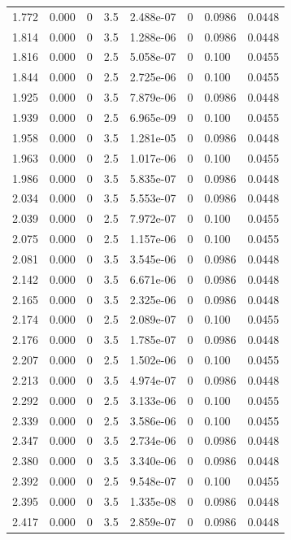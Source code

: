 \documentclass[preview]{standalone}
\begin{document}
{{{\begin{tabular}{L{1.2cm}C{1.2cm} C{0.3cm}C{0.5cm} C{1.4cm}C{1.4cm} C{1.4cm}C{1.4cm}}
  1.772  &  0.000  & 0     & 3.5 &  2.488e-07  & 0  & 0.0986 &  0.0448   \\ 
  1.814  &  0.000  & 0     & 3.5 &  1.288e-06  & 0  & 0.0986 &  0.0448   \\ 
  1.816  &  0.000  & 0     & 2.5 &  5.058e-07  & 0  & 0.100 &  0.0455   \\ 
  1.844  &  0.000  & 0     & 2.5 &  2.725e-06  & 0  & 0.100 &  0.0455   \\ 
  1.925  &  0.000  & 0     & 3.5 &  7.879e-06  & 0  & 0.0986 &  0.0448   \\ 
  1.939  &  0.000  & 0     & 2.5 &  6.965e-09  & 0  & 0.100 &  0.0455   \\ 
  1.958  &  0.000  & 0     & 3.5 &  1.281e-05  & 0  & 0.0986 &  0.0448   \\ 
  1.963  &  0.000  & 0     & 2.5 &  1.017e-06  & 0  & 0.100 &  0.0455   \\ 
  1.986  &  0.000  & 0     & 3.5 &  5.835e-07  & 0  & 0.0986 &  0.0448   \\ 
  2.034  &  0.000  & 0     & 3.5 &  5.553e-07  & 0  & 0.0986 &  0.0448   \\ 
  2.039  &  0.000  & 0     & 2.5 &  7.972e-07  & 0  & 0.100 &  0.0455   \\ 
  2.075  &  0.000  & 0     & 2.5 &  1.157e-06  & 0  & 0.100 &  0.0455   \\ 
  2.081  &  0.000  & 0     & 3.5 &  3.545e-06  & 0  & 0.0986 &  0.0448   \\ 
  2.142  &  0.000  & 0     & 3.5 &  6.671e-06  & 0  & 0.0986 &  0.0448   \\ 
  2.165  &  0.000  & 0     & 3.5 &  2.325e-06  & 0  & 0.0986 &  0.0448   \\ 
  2.174  &  0.000  & 0     & 2.5 &  2.089e-07  & 0  & 0.100 &  0.0455   \\ 
  2.176  &  0.000  & 0     & 3.5 &  1.785e-07  & 0  & 0.0986 &  0.0448   \\ 
  2.207  &  0.000  & 0     & 2.5 &  1.502e-06  & 0  & 0.100 &  0.0455   \\ 
  2.213  &  0.000  & 0     & 3.5 &  4.974e-07  & 0  & 0.0986 &  0.0448   \\ 
  2.292  &  0.000  & 0     & 2.5 &  3.133e-06  & 0  & 0.100 &  0.0455   \\ 
  2.339  &  0.000  & 0     & 2.5 &  3.586e-06  & 0  & 0.100 &  0.0455   \\ 
  2.347  &  0.000  & 0     & 3.5 &  2.734e-06  & 0  & 0.0986 &  0.0448   \\ 
  2.380  &  0.000  & 0     & 3.5 &  3.340e-06  & 0  & 0.0986 &  0.0448   \\ 
  2.392  &  0.000  & 0     & 2.5 &  9.548e-07  & 0  & 0.100 &  0.0455   \\ 
  2.395  &  0.000  & 0     & 3.5 &  1.335e-08  & 0  & 0.0986 &  0.0448   \\ 
  2.417  &  0.000  & 0     & 3.5 &  2.859e-07  & 0  & 0.0986 &  0.0448   \\ 
\hline 
\end{tabular} 

}}}
\end{document}

